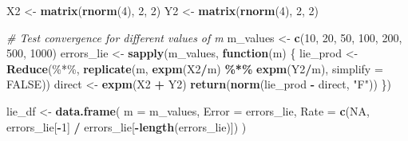 \documentclass[
]{book}
\newenvironment{Shaded}{\begin{snugshade}}{\end{snugshade}}
\newcommand{\AttributeTok}[1]{\textcolor[rgb]{0.13,0.29,0.53}{#1}}
\newcommand{\CommentTok}[1]{\textcolor[rgb]{0.56,0.35,0.01}{\textit{#1}}}
\newcommand{\ConstantTok}[1]{\textcolor[rgb]{0.56,0.35,0.01}{#1}}
\newcommand{\ControlFlowTok}[1]{\textcolor[rgb]{0.13,0.29,0.53}{\textbf{#1}}}
\newcommand{\DecValTok}[1]{\textcolor[rgb]{0.00,0.00,0.81}{#1}}
\newcommand{\FunctionTok}[1]{\textcolor[rgb]{0.13,0.29,0.53}{\textbf{#1}}}
\newcommand{\NormalTok}[1]{#1}
\newcommand{\OtherTok}[1]{\textcolor[rgb]{0.56,0.35,0.01}{#1}}
\newcommand{\SpecialCharTok}[1]{\textcolor[rgb]{0.81,0.36,0.00}{\textbf{#1}}}
\newcommand{\StringTok}[1]{\textcolor[rgb]{0.31,0.60,0.02}{#1}}
\theoremstyle{definition}
\theoremstyle{definition}
\theoremstyle{definition}
\theoremstyle{definition}
\theoremstyle{remark}
\begin{document}
\begin{Shaded}
\begin{Highlighting}[]
\NormalTok{X2 }\OtherTok{\textless{}{-}} \FunctionTok{matrix}\NormalTok{(}\FunctionTok{rnorm}\NormalTok{(}\DecValTok{4}\NormalTok{), }\DecValTok{2}\NormalTok{, }\DecValTok{2}\NormalTok{)}
\NormalTok{Y2 }\OtherTok{\textless{}{-}} \FunctionTok{matrix}\NormalTok{(}\FunctionTok{rnorm}\NormalTok{(}\DecValTok{4}\NormalTok{), }\DecValTok{2}\NormalTok{, }\DecValTok{2}\NormalTok{)}

\CommentTok{\# Test convergence for different values of m}
\NormalTok{m\_values }\OtherTok{\textless{}{-}} \FunctionTok{c}\NormalTok{(}\DecValTok{10}\NormalTok{, }\DecValTok{20}\NormalTok{, }\DecValTok{50}\NormalTok{, }\DecValTok{100}\NormalTok{, }\DecValTok{200}\NormalTok{, }\DecValTok{500}\NormalTok{, }\DecValTok{1000}\NormalTok{)}
\NormalTok{errors\_lie }\OtherTok{\textless{}{-}} \FunctionTok{sapply}\NormalTok{(m\_values, }\ControlFlowTok{function}\NormalTok{(m) \{}
\NormalTok{  lie\_prod }\OtherTok{\textless{}{-}} \FunctionTok{Reduce}\NormalTok{(}\StringTok{\textasciigrave{}}\AttributeTok{\%*\%}\StringTok{\textasciigrave{}}\NormalTok{, }\FunctionTok{replicate}\NormalTok{(m, }\FunctionTok{expm}\NormalTok{(X2}\SpecialCharTok{/}\NormalTok{m) }\SpecialCharTok{\%*\%} \FunctionTok{expm}\NormalTok{(Y2}\SpecialCharTok{/}\NormalTok{m), }\AttributeTok{simplify =} \ConstantTok{FALSE}\NormalTok{))}
\NormalTok{  direct }\OtherTok{\textless{}{-}} \FunctionTok{expm}\NormalTok{(X2 }\SpecialCharTok{+}\NormalTok{ Y2)}
  \FunctionTok{return}\NormalTok{(}\FunctionTok{norm}\NormalTok{(lie\_prod }\SpecialCharTok{{-}}\NormalTok{ direct, }\StringTok{"F"}\NormalTok{))}
\NormalTok{\})}

\NormalTok{lie\_df }\OtherTok{\textless{}{-}} \FunctionTok{data.frame}\NormalTok{(}
  \AttributeTok{m =}\NormalTok{ m\_values,}
  \AttributeTok{Error =}\NormalTok{ errors\_lie,}
  \AttributeTok{Rate =} \FunctionTok{c}\NormalTok{(}\ConstantTok{NA}\NormalTok{, errors\_lie[}\SpecialCharTok{{-}}\DecValTok{1}\NormalTok{] }\SpecialCharTok{/}\NormalTok{ errors\_lie[}\SpecialCharTok{{-}}\FunctionTok{length}\NormalTok{(errors\_lie)])}
\NormalTok{)}


\end{Highlighting}
\end{Shaded}
\end{document}
